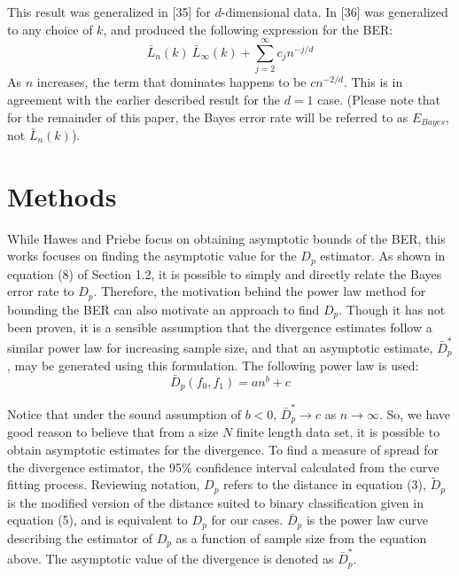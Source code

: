 \documentclass{article}
\begin{document}
	\indent This result was generalized in [35] for $d$-dimensional data. In [36] was generalized to any choice of $k$, and produced the following expression for the BER:
	\begin{equation}
	\bar{L}_n(k)~\bar{L}_\infty (k) + \sum_{j=2}^{\infty} c_j n^{-j/d}
	\end{equation}
	As $n$ increases, the term that dominates happens to be $cn^{-2/d}$. This is in agreement with the earlier described result for the $d=1$ case. (Please note that for the remainder of this paper, the Bayes error rate will be referred to as $E_{Bayes}$, not $\bar{L}_n(k)$).

	\section{Methods}
	
	\indent While Hawes and Priebe focus on obtaining asymptotic bounds of the BER, this works focuses on finding the asymptotic value for the ${D}_p$ estimator. As shown in equation (8) of Section 1.2, it is possible to simply and directly relate the Bayes error rate to ${D}_p$. Therefore, the motivation behind the power law method for bounding the BER can also motivate an approach to find ${D}_p$. Though it has not been proven, it is a sensible assumption that the divergence estimates follow a similar power law for increasing sample size, and that an asymptotic estimate,  $\bar{D}_p^*$,  may be generated using this formulation. The following power law is used:
	\begin{equation}
		\bar{D}_p(f_0,f_1)=an^b+c
	\end{equation}

	\indent Notice that under the sound assumption of $b<0$, $\bar{D}_p^* \rightarrow c$ as $n \rightarrow \infty$. So, we have good reason to believe that from a size $N$ finite length data set, it is possible to obtain asymptotic estimates for the divergence. To find a measure of spread for the divergence estimator, the 95\% confidence interval calculated from the curve fitting process. Reviewing notation, $D_p$ refers to the distance in equation (3), $\widetilde{D}_p$ is the modified version of the distance suited to binary classification given in equation (5), and is equivalent to $D_p$ for our cases. $\bar{D}_p$ is the power law curve describing the estimator of ${D}_p$ as a function of sample size from the equation above. The asymptotic value of the divergence is denoted as $\bar{D}_p^*$.
	
\end{document}
